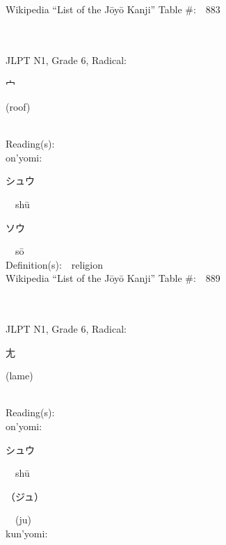 \begin{multicols}{2}
Wikipedia ``List of the J\=oy\=o Kanji'' Table \#:\ \ 883 \\
\ \ \\
{\fontsize{34pt}{40pt}  }\ \ \\  %
{JLPT N1, Grade 6, Radical:\ \ {\begin{CJK}{UTF8}{min} 宀 \end{CJK}} (roof) } \\
Reading(s):\ \ \\
{\hspace*{1em}}on'yomi:\ \ \\
{\hspace*{2em}}{\begin{CJK}{UTF8}{min} シュウ \end{CJK}}\ \ sh\=u\ \ \\
{\hspace*{2em}}{\begin{CJK}{UTF8}{min} ソウ \end{CJK}}\ \ s\=o\ \ \\
Definition(s):\ \ religion \\
Wikipedia ``List of the J\=oy\=o Kanji'' Table \#:\ \ 889 \\
\ \ \\
{\fontsize{34pt}{40pt}  }\ \ \\  %
{JLPT N1, Grade 6, Radical:\ \ {\begin{CJK}{UTF8}{min} 尢 \end{CJK}} (lame) } \\
Reading(s):\ \ \\
{\hspace*{1em}}on'yomi:\ \ \\
{\hspace*{2em}}{\begin{CJK}{UTF8}{min} シュウ \end{CJK}}\ \ sh\=u\ \ \\
{\hspace*{2em}}{\begin{CJK}{UTF8}{min} （ジュ） \end{CJK}}\ \ (ju)\ \ \\
{\hspace*{1em}}kun'yomi:\ \ \\

\end{multicols}

